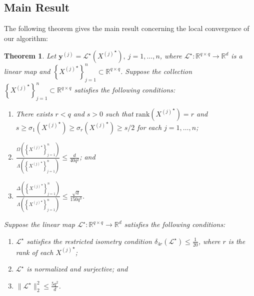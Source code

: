 \documentclass[11pt,letterpaper]{article}
\newtheorem{theorem}{Theorem}
\newcommand{\R}{\mathbb{R}}
\newcommand{\by}{\mathbf{y}}
\renewcommand{\L}{\mathcal{L}}
\begin{document}
\subsection{Main Result} \label{sec:analysis_mainresult}

The following theorem gives the main result concerning the local convergence of our algorithm:

\begin{theorem} \label{thm:localconvergence} Let $\by^{(j)} = \L^\star\left({X^{(j)}}^\star \right), ~ j=1,\dots,n$, where $\L^\star : \R^{q \times q} \rightarrow \R^d$ is a linear map and $\left\{{X^{(j)}}^\star \right\}_{j=1}^n \subset \R^{q \times q}$.  Suppose the collection $\left\{{X^{(j)}}^\star \right\}_{j=1}^n \subset \R^{q \times q}$ satisfies the following conditions:
\begin{enumerate}
\item There exists $r < q$ and $s > 0$ such that $\mathrm{rank}\left({X^{(j)}}^\star \right) = r$ and $s \geq \sigma_1\left({X^{(j)}}^\star \right) \geq \sigma_r\left({X^{(j)}}^\star \right) \geq s / 2$ for each $j = 1,\dots,n$;
\item $\frac{\Omega\left(\left\{{X^{(j)}}^\star \right\}_{j=1}^n \right)}{\Lambda\left( \left\{{X^{(j)}}^\star \right\}_{j=1}^n \right)} \leq \frac{d}{40 q^2}$; and
\item $\frac{\Delta\left(\left\{{X^{(j)}}^\star \right\}_{j=1}^n \right)}{\Lambda\left( \left\{{X^{(j)}}^\star \right\}_{j=1}^n \right)} \leq \frac{\sqrt{d}}{150 q^3}$.
\end{enumerate}
Suppose the linear map $\L^\star : \R^{q \times q} \rightarrow \R^d$ satisfies the following conditions:
\begin{enumerate}
\item $\L^\star$ satisfies the restricted isometry condition $\delta_{4r}(\L^\star) \leq \frac{1}{20}$, where $r$ is the rank of each ${X^{(j)}}^\star$;
\item $\L^\star$ is normalized and surjective; and
\item $\|\L^\star\|_2^2 \leq \frac{5 q^2}{d}$.
\end{enumerate}

\end{theorem}
\end{document}
